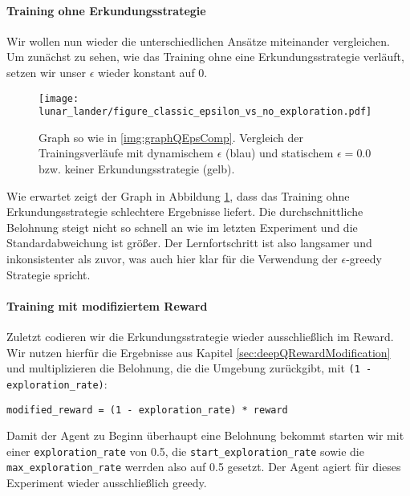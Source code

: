 \paragraph{Training ohne Erkundungsstrategie}
Wir wollen nun wieder die unterschiedlichen Ansätze miteinander vergleichen. Um zunächst zu sehen, wie das Training ohne eine Erkundungsstrategie verläuft, setzen wir unser $ \epsilon $ wieder konstant auf 0.

\begin{figure}[h!]
    \centering
    \texttt{[image: lunar\_lander/figure\_classic\_epsilon\_vs\_no\_exploration.pdf]}
    \caption{Graph so wie in \ref{img:graphQEpsComp}. Vergleich der Trainingsverläufe mit dynamischem $ \epsilon $ (blau) und statischem $ \epsilon = 0.0 $ bzw. keiner Erkundungsstrategie (gelb).} \label{img:lunarClassicEps01VsNoExploration}
\end{figure}

Wie erwartet zeigt der Graph in Abbildung \ref{img:lunarClassicEps01VsNoExploration}, dass das Training ohne Erkundungsstrategie schlechtere Ergebnisse liefert. Die durchschnittliche Belohnung steigt nicht so schnell an wie im letzten Experiment und die Standardabweichung ist größer. Der Lernfortschritt ist also langsamer und inkonsistenter als zuvor, was auch hier klar für die Verwendung der $ \epsilon $-greedy Strategie spricht.

\paragraph{Training mit modifiziertem Reward}
Zuletzt codieren wir die Erkundungsstrategie wieder ausschließlich im Reward. Wir nutzen hierfür die Ergebnisse aus Kapitel \ref{sec:deepQRewardModification} und multiplizieren die Belohnung, die die Umgebung zurückgibt, mit \texttt{(1 - exploration_rate)}:
\begin{verbatim}
modified_reward = (1 - exploration_rate) * reward
\end{verbatim}
Damit der Agent zu Beginn überhaupt eine Belohnung bekommt starten wir mit einer \texttt{exploration_rate} von 0.5, die \texttt{start_exploration_rate} sowie die \texttt{max_exploration_rate} werrden also auf 0.5 gesetzt. Der Agent agiert für dieses Experiment wieder ausschließlich greedy.

